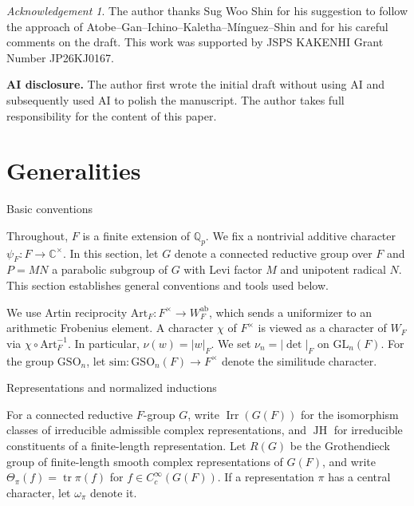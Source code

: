 \documentclass[12pt]{amsart}
\makeatletter
\renewcommand{\subsection}{\@startsection{subsection}{2}%
  \z@{.7\linespacing\@plus.5\linespacing}{.35\linespacing}%
  {\normalfont\bfseries\raggedright}}
\theoremstyle{definition}
\theoremstyle{plain}
\theoremstyle{remark}
\newtheorem*{Ac}{Acknowledgement}
\def\C{\mathbb{C}}%
\def\Q{\mathbb{Q}}%
\def\GL{\mathrm{GL}}
\def\GSO{\mathrm{GSO}}
\DeclareMathOperator{\Irr}{Irr}%
\DeclareMathOperator{\tr}{tr}%
\numberwithin{equation}{section}
\newcommand{\Art}{\mathrm{Art}}
\newcommand{\ab}{\mathrm{ab}}
\newcommand{\abs}[1]{\lvert #1 \rvert}
\makeatother
\begin{document}
  
\begin{Ac}
      The author thanks Sug Woo Shin for his suggestion to follow the approach of Atobe--Gan--Ichino--Kaletha--M\'inguez--Shin \cite{AtobeGanEtAl2025-LocalIntertwiningRelationsCoTemperedPackets} and for his careful comments on the draft.
      This work was supported by JSPS KAKENHI Grant Number JP26KJ0167. 
\end{Ac}

\smallskip
\noindent\textbf{AI disclosure.}
The author first wrote the initial draft without using AI and subsequently used AI to polish the manuscript. The author takes full responsibility for the content of this paper.





\section{Generalities}\label{sec:generalities}

\subsection{Basic conventions}\label{subsec:basic-conventions}

Throughout, $F$ is a finite extension of $\Q_p$. 
We fix a nontrivial additive character $\psi_F \colon F \to \C^\times$.
In this section, let $G$ denote a connected reductive group over $F$ and $P = MN$ a parabolic subgroup of $G$ with Levi factor $M$ and unipotent radical $N$.
This section establishes general conventions and tools used below.

We use Artin reciprocity $\Art_F \colon F^{\times} \to W_F^{\ab}$, which sends a uniformizer to an arithmetic Frobenius element.
A character $\chi$ of $F^{\times}$ is viewed as a character of $W_F$ via $\chi \circ \Art_F^{-1}$.
In particular, $\nu(w) = \abs{w}_F$.
We set $\nu_n=|\det|_F$ on $\GL_n(F)$.
For the group $\GSO_{n}$, let $\mathrm{sim} \colon \GSO_n(F) \to F^{\times}$ denote the similitude character.

\subsection{Representations and normalized inductions}\label{subsec:general-representations}

For a connected reductive $F$-group $G$, write $\Irr(G(F))$ for
the isomorphism classes of irreducible admissible complex
representations, and $\operatorname{JH}$ for irreducible constituents
of a finite-length representation. Let $R(G)$ be the
Grothendieck group of finite-length smooth complex representations
of $G(F)$, and write
$\Theta_\pi(f)=\tr\pi(f)$ for $f\in C_c^\infty(G(F))$.
If a representation $\pi$ has a central character, let $\omega_\pi$ denote it.
\end{document}

